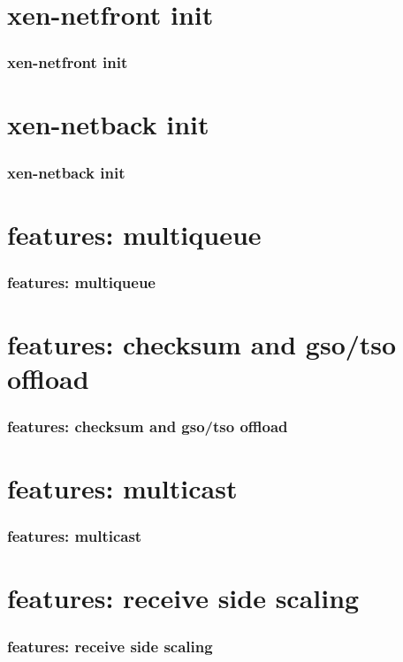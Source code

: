 \documentclass[aspectratio=169]{beamer}
\begin{document}

\section{xen-netfront init}
\begin{frame}
\frametitle{xen-netfront init}
\end{frame}


\section{xen-netback init}
\begin{frame}
\frametitle{xen-netback init}
\end{frame}


\section{features: multiqueue}
\begin{frame}
\frametitle{features: multiqueue}
\end{frame}


\section{features: checksum and gso/tso offload}
\begin{frame}
\frametitle{features: checksum and gso/tso offload}
\end{frame}


\section{features: multicast}
\begin{frame}
\frametitle{features: multicast}
\end{frame}


\section{features: receive side scaling}
\begin{frame}
\frametitle{features: receive side scaling}
\end{frame}
\end{document}
